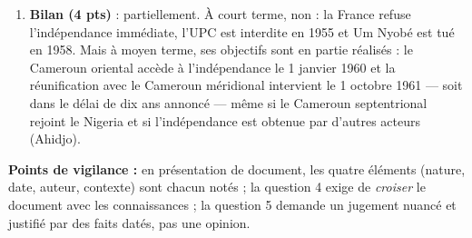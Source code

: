 \documentclass[11pt]{article}
\begin{document}
\begin{corrige}
\begin{enumerate}
\item \textbf{Bilan (4 pts)} : partiellement. À court terme, non : la France refuse l'indépendance immédiate, l'UPC est interdite en 1955 et Um Nyobé est tué en 1958. Mais à moyen terme, ses objectifs sont en partie réalisés : le Cameroun oriental accède à l'indépendance le 1\ier{} janvier 1960 et la réunification avec le Cameroun méridional intervient le 1\ier{} octobre 1961 — soit dans le délai de dix ans annoncé — même si le Cameroun septentrional rejoint le Nigeria et si l'indépendance est obtenue par d'autres acteurs (Ahidjo).
\end{enumerate}
\textbf{Points de vigilance :} en présentation de document, les quatre éléments (nature, date, auteur, contexte) sont chacun notés ; la question 4 exige de \emph{croiser} le document avec les connaissances ; la question 5 demande un jugement nuancé et justifié par des faits datés, pas une opinion.
\end{corrige}
\end{document}
